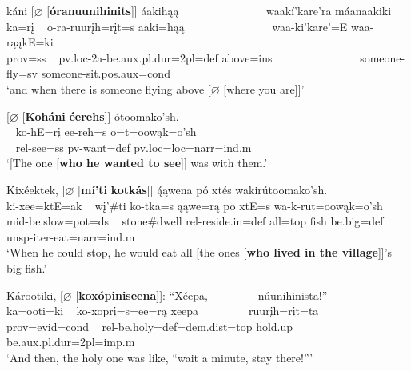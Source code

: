 \begin{exe}
\begin{xlist}
        \item\label{Ch5HeadlessRCsInCorpusC} \glll káni \textnormal{[}$\varnothing$ \textnormal{[}\textbf{óranuunihinits}\textnormal{]]} áakihąą ~ ~ ~ ~ ~ ~ ~ ~ ~ waakí'kare'ra máanaakiki\\
        ka=rį ~ o-ra-ruurįh=rįt=s aaki=hąą ~ ~ ~ ~ ~ ~ ~ ~ ~ waa-ki'kare'=E waa-rąąkE=ki\\
        prov=ss ~ pv.loc-2a-\textnormal{be}.aux.pl.dur=2pl=def \textnormal{above}=ins ~ ~ ~ ~ ~ ~ ~ ~ ~ \textnormal{someone}-\textnormal{fly}=sv \textnormal{someone}-\textnormal{sit}.pos.aux=cond\\
        \glt `and when there is someone flying above [$\varnothing$ [where you are]]' \citep[130]{hollow1973a} 

        \item\label{Ch5HeadlessRCsInCorpusE} \glll \textnormal{[}$\varnothing$ \textnormal{[}\textbf{Koháni} \textbf{éerehs}\textnormal{]]} ótoomako'sh.\\
        ~ ko-hE=rį ee-reh=s o=t=oowąk=o'sh\\
        ~ rel-\textnormal{see}=ss pv-\textnormal{want}=def pv.loc=loc=narr=ind.m\\
        \glt `[The one [\textbf{who he wanted to see}]] was with them.' \citep[127]{hollow1973a}

        \item\label{Ch5HeadlessRCsInCorpusF} \glll Kixéektek, \textnormal{[}$\varnothing$ \textnormal{[}\textbf{mí'ti} \textbf{kotkás}\textnormal{]]} ą́ąwena pó xtés wakirútoomako'sh.\\
        ki-xee=ktE=ak ~ wį'\#ti ko-tka=s ąąwe=rą po xtE=s wa-k-rut=oowąk=o'sh\\
        mid-\textnormal{be.slow}=pot=ds ~ \textnormal{stone}\#\textnormal{dwell} rel-\textnormal{reside.in}=def \textnormal{all}=top \textnormal{fish} \textnormal{be.big}=def unsp-iter-\textnormal{eat}=narr=ind.m\\
        \glt `When he could stop, he would eat all [the ones [\textbf{who lived in the village}]]'s big fish.' \citep[201]{hollow1973b}

        \item\label{Ch5HeadlessRCsInCorpusG} \glll Károotiki, \textnormal{[}$\varnothing$ \textnormal{[}\textbf{koxópiniseena}\textnormal{]]}: ``Xéepa, ~ ~ ~ ~ ~ núunihinista!''\\
        ka=ooti=ki ~ ko-xoprį=s=ee=rą xeepa ~ ~ ~ ~ ~ ruurįh=rįt=ta\\
        prov=evid=cond ~ rel-\textnormal{be.holy}=def=dem.dist=top \textnormal{hold.up} ~ ~ ~ ~ ~ \textnormal{be}.aux.pl.dur=2pl=imp.m\\
        \glt `And then, the holy one was like, ``wait a minute, stay there!{''}' \citep[259]{hollow1973b}


\end{xlist}
\end{exe}

